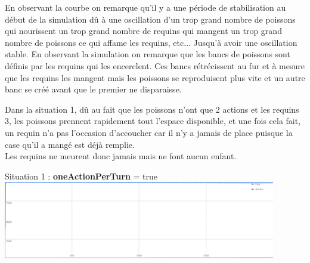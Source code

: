 \documentclass[11pt,a4paper,oneside]{report}
\begin{document}
En observant la courbe on remarque qu'il y a une période de stabilisation au début de la simulation dû à une oscillation d'un trop grand nombre de poissons qui nourissent un trop grand nombre de requins qui mangent un trop grand nombre de poissons ce qui affame les requins, etc... Jusqu'à avoir une oscillation stable.
En observant la simulation on remarque que les bancs de poissons sont définis par les requins qui les encerclent. Ces bancs rétrécissent au fur et à mesure que les requins les mangent mais les poissons se reproduisent plus vite et un autre banc se créé avant que le premier ne disparaisse.

Dans la situation 1, dû au fait que les poissons n'ont que 2 actions et les requins 3, les poissons prennent rapidement tout l'espace disponible, et une fois cela fait, un requin n'a pas l'occasion d'accoucher car il n'y a jamais de place puisque la case qu'il a mangé est déjà remplie.\\
Les requins ne meurent donc jamais mais ne font aucun enfant.

\newpage

\begin{center}
Situation 1 : \textbf{oneActionPerTurn} = true
\includegraphics[width=450px]{wator_1}\\
\end{center}
\end{document}
